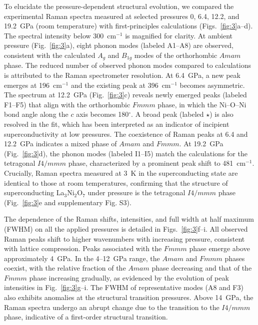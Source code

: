 \documentclass[prx,aps,twocolumn,preprintnumbers,amsmath,amssymb,superscriptaddress,showpacs]{revtex4-2}
\begin{document}
To elucidate the pressure-dependent structural evolution, we compared the experimental Raman spectra measured at selected pressures 0, 6.4, 12.2, and 19.2~GPa (room temperature) with first-principles calculations (Figs.~\ref{fig:3}a--d). The spectral intensity below 300~cm$^{-1}$ is magnified for clarity. At ambient pressure (Fig.~\ref{fig:3}a), eight phonon modes (labeled A1--A8) are observed, consistent with the calculated $A_g$ and $B_{1g}$ modes of the orthorhombic $Amam$ phase. The reduced number of observed phonon modes compared to calculations is attributed to the Raman spectrometer resolution. At 6.4~GPa, a new peak emerges at 196~cm$^{-1}$ and the existing peak at 396~cm$^{-1}$ becomes asymmetric. The spectrum at 12.2~GPa (Fig.~\ref{fig:3}c) reveals newly emerged peaks (labeled F1--F5) that align with the orthorhombic $Fmmm$ phase, in which the Ni--O--Ni bond angle along the $c$ axis becomes 180$^\circ$. A broad peak (labeled $\star$) is also resolved in the fit, which has been interpreted as an indicator of incipient superconductivity at low pressures.  The coexistence of Raman peaks at 6.4 and 12.2~GPa indicates a mixed phase of $Amam$ and $Fmmm$. At 19.2~GPa (Fig.~\ref{fig:3}d), the phonon modes (labeled I1--I5) match the calculations for the tetragonal $I4/mmm$ phase, characterized by a prominent peak shift to 481~cm$^{-1}$. Crucially, Raman spectra measured at 3~K in the superconducting state are identical to those at room temperatures, confirming that the structure of superconducting La$_3$Ni$_2$O$_7$ under pressure is the tetragonal $I4/mmm$ phase (Fig.~\ref{fig:3}e and supplementary Fig. S3).

The dependence of the Raman shifts, intensities, and full width at half maximum (FWHM) on all the applied pressures is detailed in Figs.~\ref{fig:3}f--i. All observed Raman peaks shift to higher wavenumbers with increasing pressure, consistent with lattice compression. Peaks associated with the $Fmmm$ phase emerge above approximately 4~GPa. In the 4--12~GPa range, the $Amam$ and $Fmmm$ phases coexist, with the relative fraction of the $Amam$ phase decreasing and that of the $Fmmm$ phase increasing gradually, as evidenced by the evolution of peak intensities in Fig.~\ref{fig:3}g--i. The FWHM of representative modes (A8 and F3) also exhibits anomalies at the structural transition pressures. Above 14~GPa, the Raman spectra undergo an abrupt change due to the transition to the $I4/mmm$ phase, indicative of a first-order structural transition.
\end{document}

